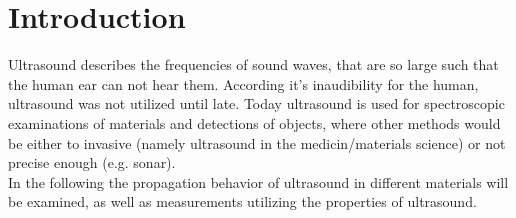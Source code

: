 \section{Introduction}

Ultrasound describes the frequencies of sound waves, that are so large such that the human ear can not hear them. According it's inaudibility for the human,
ultrasound was not utilized until late. Today ultrasound is used for spectroscopic examinations of materials and detections of objects, where other methods
would be either to invasive (namely ultrasound in the medicin/materials science) or not precise enough (e.g. sonar). \\
In the following the propagation behavior of ultrasound in different materials will be examined, as well as measurements utilizing the properties
of ultrasound.